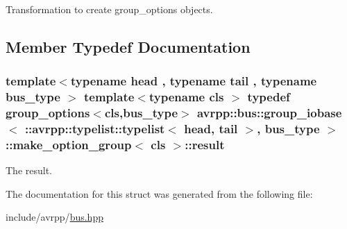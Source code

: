Transformation to create group\_\-options objects. 

\subsection{Member Typedef Documentation}
\hypertarget{structavrpp_1_1bus_1_1group__iobase_3_01_1_1avrpp_1_1typelist_1_1typelist_3_01head_00_01tail_01_a212532d66805ee5c98633543044dcc5_a9f835c6e6dd9bc79f8581b9e80b8edb7}{
\subsubsection[{result}]{\setlength{\rightskip}{0pt plus 5cm}template$<$typename head , typename tail , typename bus\_\-type $>$ template$<$typename cls $>$ typedef group\_\-options$<$cls,bus\_\-type$>$ avrpp::bus::group\_\-iobase$<$ ::{\bf avrpp::typelist::typelist}$<$ head, tail $>$, bus\_\-type $>$::make\_\-option\_\-group$<$ cls $>$::{\bf result}}}
\label{structavrpp_1_1bus_1_1group__iobase_3_01_1_1avrpp_1_1typelist_1_1typelist_3_01head_00_01tail_01_a212532d66805ee5c98633543044dcc5_a9f835c6e6dd9bc79f8581b9e80b8edb7}


The result. 



The documentation for this struct was generated from the following file:\begin{DoxyCompactItemize}
\item 
include/avrpp/\hyperlink{bus_8hpp}{bus.hpp}\end{DoxyCompactItemize}
